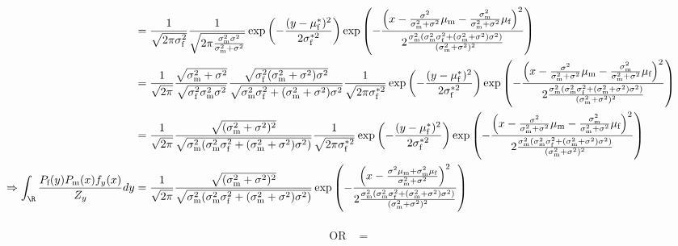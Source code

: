 \documentclass{article}\usepackage[]{graphicx}\usepackage[]{color}
\newcommand{\x}[1]{\text{#1}}
\begin{document}
\begin{landscape}
\begin{align*}
\\&=\frac{1}{\sqrt{2\pi\sigma_\x{f}^2}}\frac{1}{\sqrt{2\pi\frac{\sigma_\x{m}^2\sigma^2}{\sigma_\x{m}^2+\sigma^2}}}\exp\left(-\frac{(y-\mu_\x{f}^*)^2}{2\sigma_\x{f}^{*2}}\right)\exp\left(-\frac{\left(x-\frac{\sigma^2}{\sigma_\x{m}^2+\sigma^2}\mu_\x{m}-\frac{\sigma_\x{m}^2}{\sigma_\x{m}^2+\sigma^2}\mu_\x{f}\right)^2}{2\frac{\sigma_\x{m}^2(\sigma_\x{m}^2\sigma_\x{f}^2+(\sigma_\x{m}^2+\sigma^2)\sigma^2)}{(\sigma_\x{m}^2+\sigma^2)^2}}\right)
\\&=\frac{1}{\sqrt{2\pi}}\frac{\sqrt{\sigma_\x{m}^2+\sigma^2}}{\sqrt{\sigma_\x{f}^2\sigma_\x{m}^2\sigma^2}}\frac{\sqrt{\sigma_\x{f}^2(\sigma_\x{m}^2+\sigma^2)\sigma^2}}{\sqrt{\sigma_\x{m}^2\sigma_\x{f}^2+(\sigma_\x{m}^2+\sigma^2)\sigma^2}}\frac{1}{\sqrt{2\pi\sigma_\x{f}^{*2}}}\exp\left(-\frac{(y-\mu_\x{f}^*)^2}{2\sigma_\x{f}^{*2}}\right)\exp\left(-\frac{\left(x-\frac{\sigma^2}{\sigma_\x{m}^2+\sigma^2}\mu_\x{m}-\frac{\sigma_\x{m}^2}{\sigma_\x{m}^2+\sigma^2}\mu_\x{f}\right)^2}{2\frac{\sigma_\x{m}^2(\sigma_\x{m}^2\sigma_\x{f}^2+(\sigma_\x{m}^2+\sigma^2)\sigma^2)}{(\sigma_\x{m}^2+\sigma^2)^2}}\right)
\\&=\frac{1}{\sqrt{2\pi}}\frac{\sqrt{(\sigma_\x{m}^2+\sigma^2)^2}}{\sqrt{\sigma_\x{m}^2(\sigma_\x{m}^2\sigma_\x{f}^2+(\sigma_\x{m}^2+\sigma^2)\sigma^2)}}\frac{1}{\sqrt{2\pi\sigma_\x{f}^{*2}}}\exp\left(-\frac{(y-\mu_\x{f}^*)^2}{2\sigma_\x{f}^{*2}}\right)\exp\left(-\frac{\left(x-\frac{\sigma^2}{\sigma_\x{m}^2+\sigma^2}\mu_\x{m}-\frac{\sigma_\x{m}^2}{\sigma_\x{m}^2+\sigma^2}\mu_\x{f}\right)^2}{2\frac{\sigma_\x{m}^2(\sigma_\x{m}^2\sigma_\x{f}^2+(\sigma_\x{m}^2+\sigma^2)\sigma^2)}{(\sigma_\x{m}^2+\sigma^2)^2}}\right)
\\ \Rightarrow \int_\R \frac{P_\x{f}(y)P_\x{m}(x)f_y(x)}{Z_y}dy&=\frac{1}{\sqrt{2\pi}}\frac{\sqrt{(\sigma_\x{m}^2+\sigma^2)^2}}{\sqrt{\sigma_\x{m}^2(\sigma_\x{m}^2\sigma_\x{f}^2+(\sigma_\x{m}^2+\sigma^2)\sigma^2)}}\exp\left(-\frac{\left(x-\frac{\sigma^2\mu_\x{m}+\sigma_\x{m}^2\mu_\x{f}}{\sigma_\x{m}^2+\sigma^2}\right)^2}{2\frac{\sigma_\x{m}^2(\sigma_\x{m}^2\sigma_\x{f}^2+(\sigma_\x{m}^2+\sigma^2)\sigma^2)}{(\sigma_\x{m}^2+\sigma^2)^2}}\right)
\end{align*}
\end{landscape}
\begin{align*}
\\ \text{ OR } &=
\end{align*}
\end{document}

